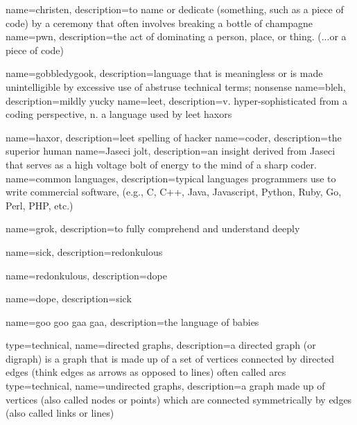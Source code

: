 {
    name=christen,
    description={to name or dedicate (something, such as a piece of code) by a ceremony that often involves breaking a bottle of champagne}
}
{
    name=pwn,
    description={the act of dominating a person, place, or thing. (...or a piece of code)}
}

{
    name=gobbledygook,
    description={language that is meaningless or is made unintelligible by excessive use of abstruse technical terms; nonsense}
}
{
    name=bleh,
    description={mildly yucky}
}
{
    name=leet,
    description={v. hyper-sophisticated from a coding perspective, n. a language used by \gls{leet} \gls{haxor}s}
}

{
    name=haxor,
    description={\gls{leet} spelling of hacker}
}
{
    name=coder,
    description={the superior human}
}
{
    name=Jaseci jolt,
    description={an insight derived from Jaseci that serves as a high voltage bolt of energy to the mind of a sharp coder.}
}
{
    name=common languages,
    description={typical languages programmers use to write commercial software, (e.g., C, C++, Java, Javascript, Python, Ruby, Go, Perl, PHP, etc.)}
}

{
    name=grok,
    description={to fully comprehend and understand deeply }
}

{
    name=sick,
    description={\gls{redonkulous}}
}

{
    name=redonkulous,
    description={\gls{dope}}
}

{
    name=dope,
    description={\gls{sick}}
}

{
    name=goo goo gaa gaa,
    description={the language of babies}
}

{
    type=technical,
    name=directed graphs,
    description={a directed graph (or digraph) is a graph that is made up of a set of vertices connected by directed edges (think edges as arrows as opposed to lines) often called arcs}
}
{
    type=technical,
    name=undirected graphs,
    description={a graph made up of vertices (also called nodes or points) which are connected symmetrically by edges (also called links or lines)}
}

